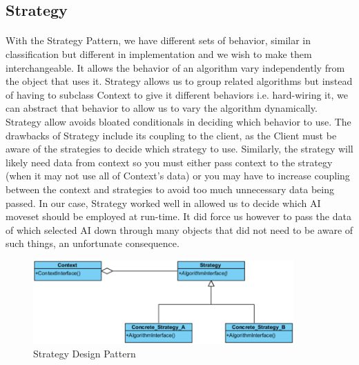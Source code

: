 \subsection{Strategy}
	\vspace{3 mm}
	\begin{multicols}{2}
	\paragraph{}
		With the Strategy Pattern, we have different sets of behavior, similar in classification but different in implementation and we wish to 
		make them interchangeable. It allows the behavior of an algorithm vary independently from the object that uses it.
		\newline
		\newline
		Strategy allows us to group related algorithms but instead of having to subclass Context to give it different behaviors i.e. hard-wiring it, 
		we can abstract that behavior to allow us to vary the algorithm dynamically. Strategy allow avoids bloated conditionals in deciding which 
		behavior to use.
		\newline
		\newline
		The drawbacks of Strategy include its coupling to the client, as the Client must be aware of the strategies to decide which strategy to use.
		Similarly, the strategy will likely need data from context so you must either pass context to the strategy (when it may not use all of 
		Context’s data) or you may have to increase coupling between the context and strategies  to avoid too much unnecessary data being passed.
		\newline
		\newline
		In our case, Strategy worked well in allowed us to decide which AI moveset should be employed at run-time. It did force us however to pass 
		the data of which selected AI down through many objects that did not need to be aware of such things, an unfortunate consequence.
		\newline
		\newline
	\end{multicols}	
		
	\begin{figure}[h!]
		\centering
		\includegraphics[width=100mm]{figures/strategy.png}
		  \caption{Strategy Design Pattern}
	\end{figure}
	
